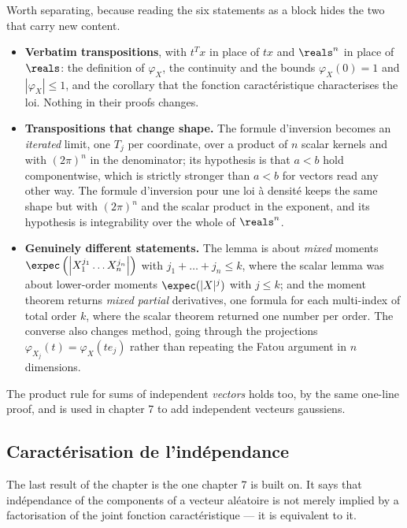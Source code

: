 \begin{remark}
Worth separating, because reading the six statements as a block hides the two that carry new
content.
\begin{itemize}
  \item \textbf{Verbatim transpositions}, with $t^{T}x$ in place of
    $tx$ and $\reals^{n}$ in place of $\reals$: the definition of $\varphi_{X}$, the
    continuity and the bounds $\varphi_{X}(0) = 1$ and $\left|\varphi_{X}\right| \leq 1$,
    and the corollary that the fonction caractéristique characterises the loi. Nothing in
    their proofs changes.
  \item \textbf{Transpositions that change shape.} The formule d'inversion
    becomes an \emph{iterated} limit, one $T_{j}$ per coordinate, over a product of $n$
    scalar kernels and with $(2\pi)^{n}$ in the denominator; its hypothesis is that $a < b$
    hold componentwise, which is strictly stronger than $a < b$ for vectors read any other
    way. The formule d'inversion pour une loi à densité keeps the same shape but with
    $(2\pi)^{n}$ and the scalar product in the exponent, and its hypothesis is integrability
    over the whole of $\reals^{n}$.
  \item \textbf{Genuinely different statements.} The lemma is about
    \emph{mixed} moments $\expec\left(\left|X_{1}^{j_{1}}\dots X_{n}^{j_{n}}\right|\right)$
    with $j_{1}+\dots+j_{n} \leq k$, where the scalar lemma was about lower-order moments
    $\expec(|X|^{j})$ with $j \leq k$; and the moment theorem returns \emph{mixed partial}
    derivatives, one formula for each multi-index of total order $k$, where the scalar
    theorem returned one number per order. The converse also changes method, going through
    the projections $\varphi_{X_{j}}(t) = \varphi_{X}(te_{j})$ rather than repeating the
    Fatou argument in $n$ dimensions.
\end{itemize}
The product rule for sums of independent \emph{vectors} holds too, by the same one-line
proof, and is used in chapter 7 to add independent vecteurs gaussiens.
\end{remark}

\subsection{Caractérisation de l'indépendance}

The last result of the chapter is the one chapter 7 is built on. It says that indépendance
of the components of a vecteur aléatoire is not merely implied by a factorisation of the joint
fonction caractéristique --- it is equivalent to it.

